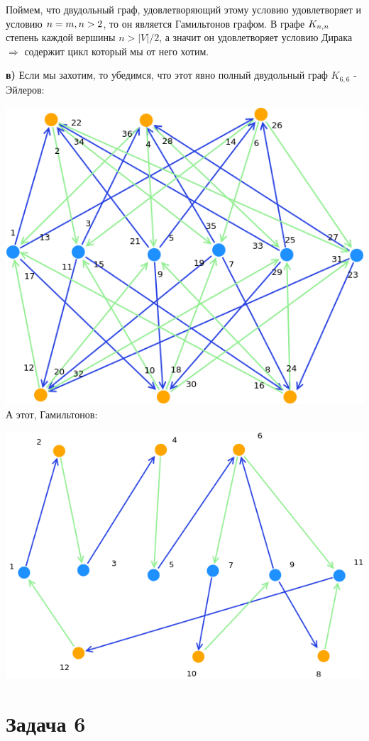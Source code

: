 \documentclass{article}
\begin{document}
 Поймем, что двудольный граф, удовлетворяющий этому условию удовлетворяет и условию $n = m,\space n > 2$, то он является Гамильтонов графом. 
 В графе $K_{n,\space n}$ степень каждой вершины $n > |V| / 2$, а значит он удовлетворяет условию Дирака $\Rightarrow$ содержит цикл который мы от него хотим.

\textbf{в)} Если мы захотим, то убедимся, что этот явно полный двудольный граф $K_{6,6}$ - Эйлеров:

\includegraphics[scale=0.7]{5_1}
\newpage
А этот, Гамильтонов:

\includegraphics[scale=0.7]{5_2}

\section{Задача 6}
\end{document}
